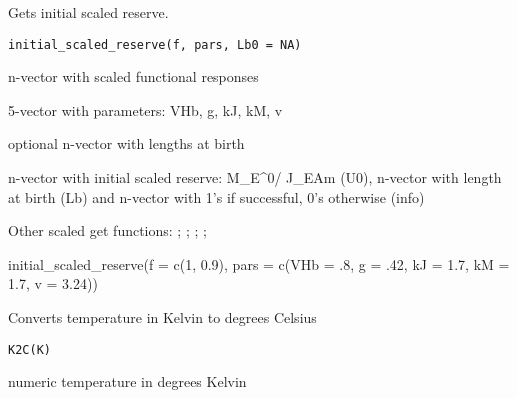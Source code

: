 \documentclass[a4paper]{book}
\begin{document}
%
\begin{Description}\relax
Gets initial scaled reserve.
\end{Description}
%
\begin{Usage}
\begin{verbatim}
initial_scaled_reserve(f, pars, Lb0 = NA)
\end{verbatim}
\end{Usage}
%
\begin{Arguments}
\begin{ldescription}
\item[\code{f}] n-vector with scaled functional responses

\item[\code{pars}] 5-vector with parameters: VHb, g, kJ, kM, v

\item[\code{Lb0}] optional n-vector with lengths at birth
\end{ldescription}
\end{Arguments}
%
\begin{Value}
n-vector with initial scaled reserve: M\_E\textasciicircum{}0/ J\_EAm (U0), n-vector with length at birth (Lb) and n-vector with 1's if successful, 0's otherwise (info)
\end{Value}
%
\begin{SeeAlso}\relax
Other scaled get functions: ;
; ;
; 
\end{SeeAlso}
%
\begin{Examples}
\begin{ExampleCode}
initial_scaled_reserve(f = c(1, 0.9), pars = c(VHb = .8, g = .42, kJ = 1.7, kM = 1.7, v = 3.24))
\end{ExampleCode}
\end{Examples}
%
\begin{Description}\relax
Converts temperature in Kelvin to degrees Celsius
\end{Description}
%
\begin{Usage}
\begin{verbatim}
K2C(K)
\end{verbatim}
\end{Usage}
%
\begin{Arguments}
\begin{ldescription}
\item[\code{K}] numeric temperature in degrees Kelvin
\end{ldescription}
\end{Arguments}
\end{document}
